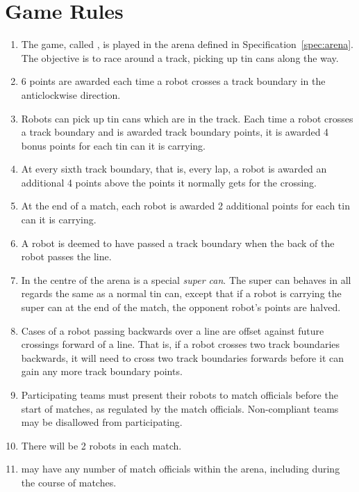 \section{Game Rules}
\label{sec:rules}

\begin{enumerate}
  \item The game, called \emph{\gamename}, is played in the arena defined in
        Specification~\ref{spec:arena}. The objective is to race around a
        track, picking up tin cans along the way.
  \item 6 points are awarded each time a robot crosses a track boundary in the
        anticlockwise direction.
  \item Robots can pick up tin cans which are in the track. Each time a robot
        crosses a track boundary and is awarded track boundary points, it is
        awarded 4 bonus points for each tin can it is carrying.
  \item At every sixth track boundary, that is, every lap, a robot is awarded
        an additional 4 points above the points it normally gets for the
        crossing.
  \item At the end of a match, each robot is awarded 2 additional points for
        each tin can it is carrying.
  \item A robot is deemed to have passed a track boundary when the back of the
        robot passes the line.
  \item In the centre of the arena is a special \emph{super can}. The super can
        behaves in all regards the same as a normal tin can, except that if a
        robot is carrying the super can at the end of the match, the opponent
        robot's points are halved.
  \item Cases of a robot passing backwards over a line are offset against
        future crossings forward of a line. That is, if a robot crosses two
        track boundaries backwards, it will need to cross two track boundaries
        forwards before it can gain any more track boundary points.
  \item Participating teams must present their robots to match officials before
        the start of matches, as regulated by the match officials. Non-compliant
        teams may be disallowed from participating.
  \item There will be 2 robots in each match.
  \item \org may have any number of match officials within the arena, including
        during the course of matches.

\end{enumerate}
